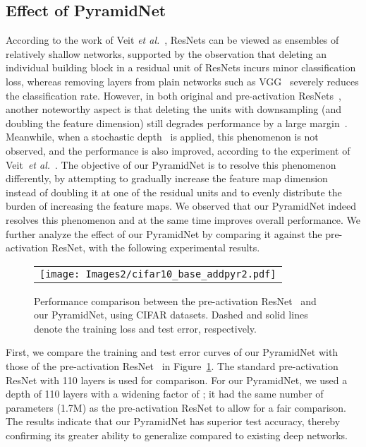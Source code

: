 \documentclass[10pt,twocolumn,letterpaper]{article}
\begin{document}
\subsection{Effect of PyramidNet}
According to the work of Veit {\it et al.}~\cite{ensemble}, ResNets can be viewed as ensembles of relatively shallow networks, supported by the observation that deleting an individual building block in a residual unit of ResNets incurs minor classification loss, whereas removing layers from plain networks such as VGG~\cite{VGG} severely reduces the classification rate. However, in both original and pre-activation ResNets~\cite{resnet,preresnet}, another noteworthy aspect is that deleting the units with downsampling (and doubling the feature dimension) still degrades performance by a large margin~\cite{ensemble}. Meanwhile, when a stochastic depth~\cite{stochasticdepth} is applied, this phenomenon is not observed, and the performance is also improved, according to the experiment of Veit~{\it et al.}~\cite{ensemble}. The objective of our PyramidNet is to resolve this phenomenon differently, by attempting to gradually increase the feature map dimension instead of doubling it at one of the residual units and to evenly distribute the burden of increasing the feature maps. We observed that our PyramidNet indeed resolves this phenomenon and at the same time improves overall performance. We further analyze the effect of our PyramidNet by comparing it against the pre-activation ResNet, with the following experimental results.
\begin{figure}[t]
\begin{center}
\begin{tabular}{c}
\texttt{[image: Images2/cifar10\_base\_addpyr2.pdf]}
\end{tabular}
\end{center}
\caption{Performance comparison between the pre-activation ResNet~\cite{preresnet} and our PyramidNet, using CIFAR datasets. Dashed and solid lines denote the training loss and test error, respectively.}
\label{fig:curves}
\end{figure}
First, we compare the training and test error curves of our PyramidNet with those of the pre-activation ResNet~\cite{preresnet} in Figure~\ref{fig:curves}. The standard pre-activation ResNet with 110 layers is used for comparison. For our PyramidNet, we used a depth of 110 layers with a widening factor of ; it had the same number of parameters (1.7M) as the pre-activation ResNet to allow for a fair comparison. The results indicate that our PyramidNet has superior test accuracy, thereby confirming its greater ability to generalize compared to existing deep networks.
\end{document}
